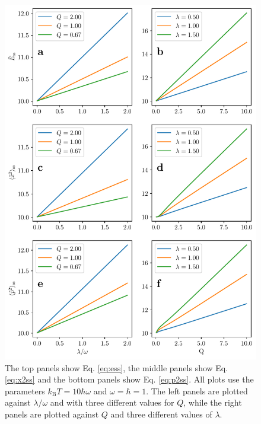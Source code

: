 \begin{figure}
    \centering
    \includegraphics[width=\textwidth]{measurement_result.pdf}
    \caption{ \small The top panels show Eq. \eqref{eq:ess}, the middle panels show Eq. \eqref{eq:x2ss} and the bottom panels show Eq. \eqref{eq:p2ss}. All plots use the parameters $k_\mathrm{B}T = 10 \hbar \omega$ and $\omega = \hbar = 1$. The left panels are plotted against $\lambda / \omega$ and with three different values for $Q$, while the right panels are plotted against $Q$ and three different values of $\lambda$. }
    \label{fig:steady_state}
\end{figure}
